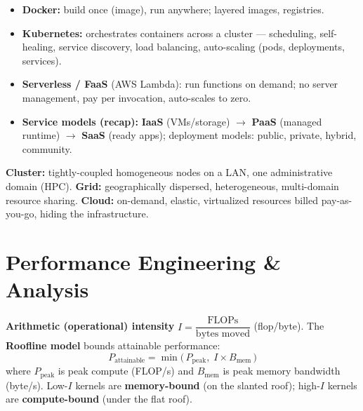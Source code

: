 \documentclass[11pt,a4paper]{article}
\begin{document}
\begin{itemize}[leftmargin=*, itemsep=2pt]
  \item \textbf{Docker:} build once (image), run anywhere; layered images, registries.
  \item \textbf{Kubernetes:} orchestrates containers across a cluster --- scheduling, self-healing, service discovery, load balancing, auto-scaling (pods, deployments, services).
  \item \textbf{Serverless / FaaS} (AWS Lambda): run functions on demand; no server management, pay per invocation, auto-scales to zero.
  \item \textbf{Service models (recap):} \textbf{IaaS} (VMs/storage) $\to$ \textbf{PaaS} (managed runtime) $\to$ \textbf{SaaS} (ready apps); deployment models: public, private, hybrid, community.
\end{itemize}

\begin{conceptbox}
\textbf{Cluster:} tightly-coupled homogeneous nodes on a LAN, one administrative domain (HPC). \textbf{Grid:} geographically dispersed, heterogeneous, multi-domain resource sharing. \textbf{Cloud:} on-demand, elastic, virtualized resources billed pay-as-you-go, hiding the infrastructure.
\end{conceptbox}

\section{Performance Engineering \& Analysis}

\begin{definitionbox}
\textbf{Arithmetic (operational) intensity} $I = \dfrac{\text{FLOPs}}{\text{bytes moved}}$ (flop/byte). The \textbf{Roofline model} bounds attainable performance:
\[
P_{\text{attainable}} = \min\big(\,P_{\text{peak}},\; I \times B_{\text{mem}}\,\big)
\]
where $P_{\text{peak}}$ is peak compute (FLOP/s) and $B_{\text{mem}}$ is peak memory bandwidth (byte/s). Low-$I$ kernels are \textbf{memory-bound} (on the slanted roof); high-$I$ kernels are \textbf{compute-bound} (under the flat roof).
\end{definitionbox}
\end{document}
